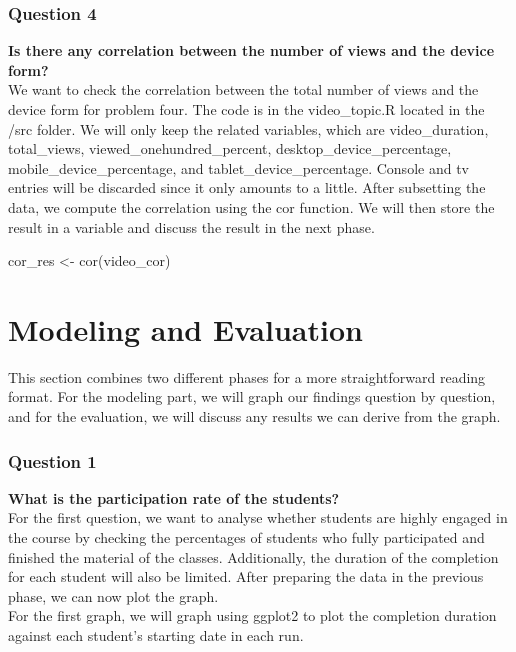 \documentclass[12pt,]{article}
\newenvironment{Shaded}{\begin{snugshade}}{\end{snugshade}}
\newcommand{\FunctionTok}[1]{\textcolor[rgb]{0.00,0.00,0.00}{#1}}
\newcommand{\NormalTok}[1]{#1}
\newcommand{\OtherTok}[1]{\textcolor[rgb]{0.56,0.35,0.01}{#1}}
\begin{document}
\hypertarget{question-4}{%
\subsubsection{Question 4}\label{question-4}}

\textbf{Is there any correlation between the number of views and the
device form?}\\
\hfill\break We want to check the correlation between the total number
of views and the device form for problem four. The code is in the
video\_topic.R located in the /src folder. We will only keep the related
variables, which are video\_duration, total\_views,
viewed\_onehundred\_percent, desktop\_device\_percentage,
mobile\_device\_percentage, and tablet\_device\_percentage. Console and
tv entries will be discarded since it only amounts to a little. After
subsetting the data, we compute the correlation using the cor function.
We will then store the result in a variable and discuss the result in
the next phase.

\begin{Shaded}
\begin{Highlighting}[]
\NormalTok{cor\_res }\OtherTok{\textless{}{-}} \FunctionTok{cor}\NormalTok{(video\_cor)}
\end{Highlighting}
\end{Shaded}

\hypertarget{modeling-and-evaluation}{%
\section{Modeling and Evaluation}\label{modeling-and-evaluation}}

This section combines two different phases for a more straightforward
reading format. For the modeling part, we will graph our findings
question by question, and for the evaluation, we will discuss any
results we can derive from the graph.

\hypertarget{question-1-1}{%
\subsubsection{Question 1}\label{question-1-1}}

\textbf{What is the participation rate of the students?}\\
\hfill\break For the first question, we want to analyse whether students
are highly engaged in the course by checking the percentages of students
who fully participated and finished the material of the classes.
Additionally, the duration of the completion for each student will also
be limited. After preparing the data in the previous phase, we can now
plot the graph.\\
\hfill\break For the first graph, we will graph using ggplot2 to plot
the completion duration against each student's starting date in each
run.
\end{document}
